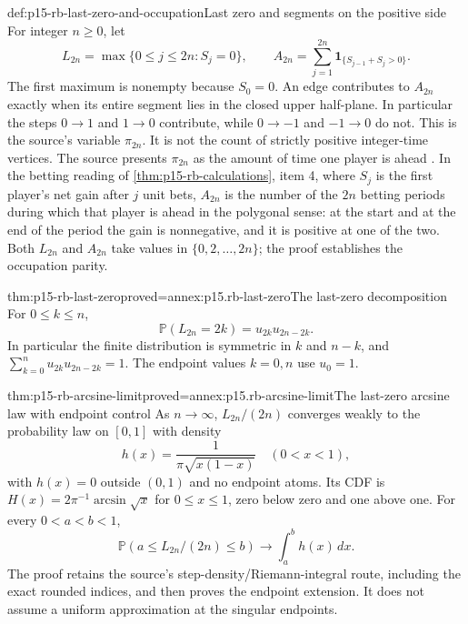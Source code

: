 \begin{hbdefinition}{def:p15-rb-last-zero-and-occupation}{Last zero and segments on the positive side}
For integer \(n\geq0\), let
\[
 L_{2n}=\max\{0\leq j\leq2n:S_j=0\},
 \qquad
 A_{2n}=\sum_{j=1}^{2n}\mathbf1_{\{S_{j-1}+S_j>0\}}.
 \]
The first maximum is nonempty because \(S_0=0\).
An edge contributes to \(A_{2n}\) exactly when its entire
segment lies in the closed upper half-plane. In particular
the steps \(0\to1\) and \(1\to0\) contribute, while
\(0\to-1\) and \(-1\to0\) do not.
This is the source's variable \(\pi_{2n}\).
It is not the count of strictly positive integer-time vertices.
The source presents \(\pi_{2n}\) as the amount of time one player is
ahead \cite[p.~266]{DurrettPTEAuthor2019}. In the betting reading of
\cref{thm:p15-rb-calculations}, item 4, where \(S_j\) is the first
player's net gain after \(j\) unit bets, \(A_{2n}\) is the number of
the \(2n\) betting periods during which that player is ahead in the
polygonal sense: at the start and at the end of the period the gain is
nonnegative, and it is positive at one of the two.
Both \(L_{2n}\) and \(A_{2n}\) take values in
\(\{0,2,\ldots,2n\}\); the proof establishes the occupation parity.
\end{hbdefinition}

\begin{hbtheorem}{thm:p15-rb-last-zero}{proved=annex:p15.rb-last-zero}{The last-zero decomposition}
For \(0\leq k\leq n\),
\[
                   \mathbb P(L_{2n}=2k)=u_{2k}u_{2n-2k}.
 \]
In particular the finite distribution is symmetric in
\(k\) and \(n-k\), and
\(\sum_{k=0}^n u_{2k}u_{2n-2k}=1\).
The endpoint values \(k=0,n\) use \(u_0=1\).
\end{hbtheorem}

\begin{hbtheorem}{thm:p15-rb-arcsine-limit}{proved=annex:p15.rb-arcsine-limit}{The last-zero arcsine law with endpoint control}
As \(n\to\infty\), \(L_{2n}/(2n)\) converges weakly to the
probability law on \([0,1]\) with density
\[
 h(x)=\frac1{\pi\sqrt{x(1-x)}}\quad(0<x<1),
 \]
with \(h(x)=0\) outside \((0,1)\) and no endpoint atoms.
Its CDF is \(H(x)=2\pi^{-1}\arcsin\sqrt x\) for
\(0\leq x\leq1\), zero below zero and one above one.
For every \(0<a<b<1\),
\[
 \mathbb P(a\leq L_{2n}/(2n)\leq b)
                                  \longrightarrow\int_a^b h(x)\,dx.
 \]
The proof retains the source's step-density/Riemann-integral route,
including the exact rounded indices, and then proves the endpoint
extension. It does not assume a uniform approximation at the
singular endpoints.
\end{hbtheorem}

